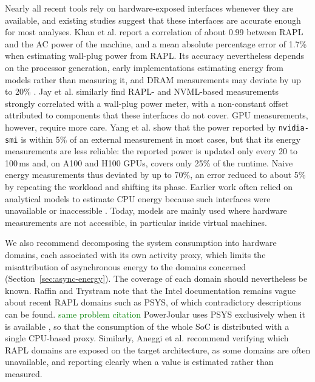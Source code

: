 \documentclass[
  acmsmall,
  screen,
  review,
  xcolor={dvipsnames,usenames}
]{acmart}
\newcommand{\iness}[1]{\textcolor{green}{#1}}
\begin{document}
Nearly all recent tools rely on hardware-exposed interfaces whenever they are available, and existing studies suggest that these interfaces are accurate enough for most analyses. Khan et al. \cite{khanRAPLActionExperiences2018} report a correlation of about 0.99 between RAPL and the AC power of the machine, and a mean absolute percentage error of 1.7\% when estimating wall-plug power from RAPL. Its accuracy nevertheless depends on the processor generation, early implementations estimating energy from models rather than measuring it, and DRAM measurements may deviate by up to 20\% \cite{khanRAPLActionExperiences2018}. Jay et al. \cite{jayExperimentalComparisonSoftwarebased2023} similarly find RAPL- and NVML-based measurements strongly correlated with a wall-plug power meter, with a non-constant offset attributed to components that these interfaces do not cover. GPU measurements, however, require more care. Yang et al. \cite{yangParttimePowerMeasurements2024} show that the power reported by \texttt{nvidia-smi} is within 5\% of an external measurement in most cases, but that its energy measurements are less reliable: the reported power is updated only every 20 to 100\,ms and, on A100 and H100 GPUs, covers only 25\% of the runtime. Naive energy measurements thus deviated by up to 70\%, an error reduced to about 5\% by repeating the workload and shifting its phase. Earlier work often relied on analytical models to estimate CPU energy because such interfaces were unavailable or inaccessible \cite{noureddineMonitoringEnergyHotspots2015,doPTopProcesslevelPower2009}. Today, models are mainly used where hardware measurements are not accessible, in particular inside virtual machines.


We also recommend decomposing the system consumption into hardware domains, each associated with its own activity proxy, which limits the misattribution of asynchronous energy to the domains concerned (Section~\ref{sec:async-energy}). The coverage of each domain should nevertheless be known. Raffin and Trystram \cite{raffinDissectingSoftwarebasedMeasurement2025} note that the Intel documentation remains vague about recent RAPL domains such as PSYS, of which contradictory descriptions can be found. \iness{same problem citation} PowerJoular uses PSYS exclusively when it is available \cite{noureddinePowerJoularJoularJXMultiPlatform2022}, so that the consumption of the whole SoC is distributed with a single CPU-based proxy. Similarly, Aneggi et al. \cite{aneggiMeasuringSoftwareEnergy2026} recommend verifying which RAPL domains are exposed on the target architecture, as some domains are often unavailable, and reporting clearly when a value is estimated rather than measured.
\end{document}
